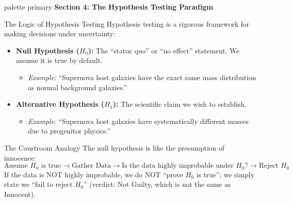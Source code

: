 \documentclass[9pt]{beamer}
\begin{document}
\begin{frame}[plain]
  \vfill
  \centering
  \begin{beamercolorbox}[sep=8pt,center,shadow=true,rounded=true]{palette primary}
    \textbf{Section 4: The Hypothesis Testing Paradigm}
  \end{beamercolorbox}
  \vfill
\end{frame}

\begin{frame}{The Logic of Hypothesis Testing}
  Hypothesis testing is a rigorous framework for making decisions under uncertainty:
  \begin{itemize}
    \item \textbf{Null Hypothesis ($H_0$):} The ``status quo'' or ``no effect'' statement. We assume it is true by default.
      \begin{itemize}
        \item \textit{Example:} ``Supernova host galaxies have the exact same mass distribution as normal background galaxies.''
      \end{itemize}
    \item \textbf{Alternative Hypothesis ($H_1$):} The scientific claim we wish to establish.
      \begin{itemize}
        \item \textit{Example:} ``Supernova host galaxies have systematically different masses due to progenitor physics.''
      \end{itemize}
  \end{itemize}
  \begin{block}{The Courtroom Analogy}
    The null hypothesis is like the presumption of innocence:
    $$\text{Assume } H_0 \text{ is true} \rightarrow \text{Gather Data} \rightarrow \text{Is the data highly improbable under } H_0? \rightarrow \text{Reject } H_0$$
    If the data is NOT highly improbable, we do NOT ``prove $H_0$ is true''; we simply state we ``fail to reject $H_0$'' (verdict: Not Guilty, which is not the same as Innocent).
  \end{block}
\end{frame}
\end{document}
